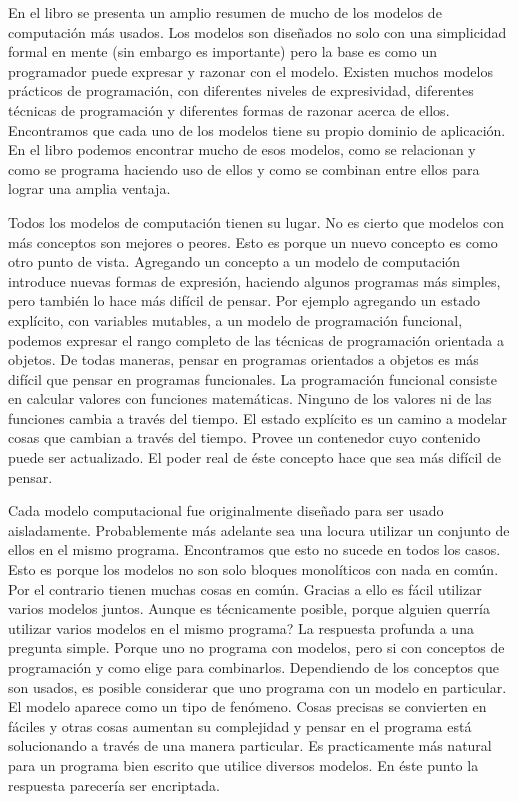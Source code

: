 \documentclass[a4paper,11pt]{article}
\begin{document}
En el libro se presenta un amplio resumen de mucho de los modelos de computación más usados. Los modelos son diseñados no solo con una simplicidad formal en mente (sin embargo es importante) pero la base es como un programador puede expresar y razonar con el modelo. Existen muchos modelos prácticos de programación, con diferentes niveles de expresividad, diferentes técnicas de programación y diferentes formas de razonar acerca de ellos. Encontramos que cada uno de los modelos tiene su propio dominio de aplicación.
En el libro podemos encontrar mucho de esos modelos, como se relacionan y como se programa haciendo uso de ellos y como se combinan entre ellos para lograr una amplia ventaja.

Todos los modelos de computación tienen su lugar. No es cierto que modelos con más conceptos son mejores o peores. Esto es porque un nuevo concepto es como otro punto de vista. Agregando un concepto a un modelo de computación introduce nuevas formas de expresión, haciendo algunos programas más simples, pero también lo hace más difícil de pensar. Por ejemplo agregando un estado explícito, con variables mutables, a un modelo de programación funcional, podemos expresar el rango completo de las técnicas de programación orientada a objetos. De todas maneras, pensar en programas orientados a objetos es más difícil que pensar en programas funcionales. La programación funcional consiste en calcular valores con funciones matemáticas. Ninguno de los valores ni de las funciones cambia a través del tiempo. El estado explícito es un camino a modelar cosas que cambian a través del tiempo. Provee un contenedor cuyo contenido puede ser actualizado. El poder real de éste concepto hace que sea más difícil de pensar.

Cada modelo computacional fue originalmente diseñado para ser usado aisladamente. Probablemente más adelante sea una locura utilizar un conjunto de ellos en el mismo programa. Encontramos que esto no sucede en todos los casos. Esto es porque los modelos no son solo bloques monolíticos con nada en común. Por el contrario tienen muchas cosas en común.
Gracias a ello es fácil utilizar varios modelos juntos.
Aunque es técnicamente posible, porque alguien querría utilizar varios modelos en el mismo programa? La respuesta profunda a una pregunta simple. Porque uno no programa con modelos, pero si con conceptos de programación y como elige para combinarlos. Dependiendo de los conceptos que son usados, es posible considerar que uno programa con un modelo en particular. El modelo aparece como un tipo de fenómeno. Cosas precisas se convierten en fáciles y otras cosas aumentan su complejidad y pensar en el programa está solucionando a través de una manera particular. Es practicamente más natural para un programa bien escrito que utilice diversos modelos. En éste punto la respuesta parecería ser encriptada.
\end{document}
